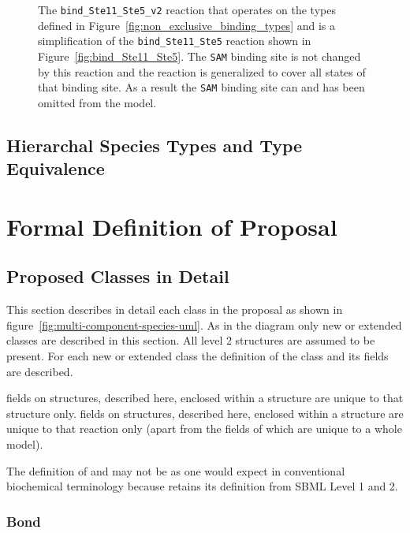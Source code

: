 \documentclass{cekarticle}
\begin{document}
\begin{figure}[h]
  \caption{
  The \texttt{bind\_Ste11\_Ste5\_v2} reaction that operates on the types defined in
  Figure~\ref{fig:non_exclusive_binding_types} and is a simplification of the \texttt{bind\_Ste11\_Ste5}
  reaction shown in Figure~\ref{fig:bind_Ste11_Ste5}. The \texttt{SAM} binding site is not changed by
  this reaction and the reaction is generalized to cover all states of that binding site.  As a result
  the
  \texttt{SAM}
  binding site
  can and
  has been omitted from the model.}
  
  \label{fig:bind_Ste11_Ste5_v2}
\end{figure}

\subsection{Hierarchal Species Types and Type Equivalence}

\clearpage

\section{Formal Definition of Proposal}
\label{sec:definitions}

\subsection{Proposed Classes in Detail}
This section describes in detail each class in the proposal as shown in
figure~\ref{fig:multi-component-species-uml}.
As in the diagram only new or extended classes are described in this section.
All level 2 structures are assumed to be present.
For each new or extended class the definition of the class and its fields are described.

 fields on structures, described here, enclosed within a  structure
are unique to that structure only.
 fields on structures, described here, enclosed within a  structure are
unique to that reaction only (apart from the  fields of 
which are unique to a whole model).

The definition of  and  may not be as one would
expect in conventional biochemical terminology because  retains its definition
from SBML Level 1 and 2.

\subsubsection{Bond}
\end{document}

